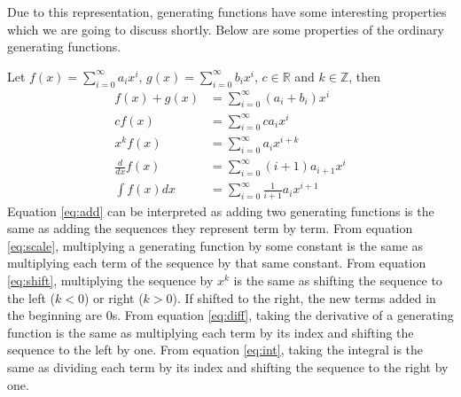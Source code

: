 Due to this representation, generating functions have some interesting properties which we are going to discuss
shortly. Below are some properties of the ordinary generating functions.

Let $f(x) = \sum_{i=0}^{\infty} a_ix^i$, $g(x) = \sum_{i=0}^{\infty} b_ix^i$, $c \in \mathbb{R}$ and $k \in
\mathbb{Z}$, then
\begin{align}
f(x) + g(x) &= \sum_{i=0}^{\infty} (a_i + b_i) x^i \label{eq:add} \\
cf(x) &= \sum_{i=0}^{\infty} ca_ix^i \label{eq:scale} \\
x^kf(x) &= \sum_{i=0}^{\infty} a_ix^{i+k} \label{eq:shift} \\
\frac{d}{dx}f(x) &= \sum_{i=0}^{\infty} (i+1)a_{i+1}x^i \label{eq:diff} \\
\int f(x) dx &= \sum_{i=0}^{\infty} \frac{1}{i+1}a_ix^{i+1} \label{eq:int}
\end{align}
Equation \ref{eq:add} can be interpreted as adding two generating functions is the same as adding the sequences they
represent term by term. From equation \ref{eq:scale}, multiplying a generating function by some constant is the same
as multiplying each term of the sequence by that same constant. From equation \ref{eq:shift}, multiplying the
sequence by $x^k$ is the same as shifting the sequence to the left ($k<0$) or right ($k>0$). If shifted to the right,
 the new terms added in the beginning are $0$s. From equation \ref{eq:diff}, taking the derivative of a generating
 function is the same as multiplying each term by its index and shifting the sequence to the left by one. From
 equation \ref{eq:int}, taking the integral is the same as dividing each term by its index and shifting the sequence
 to the right by one.


